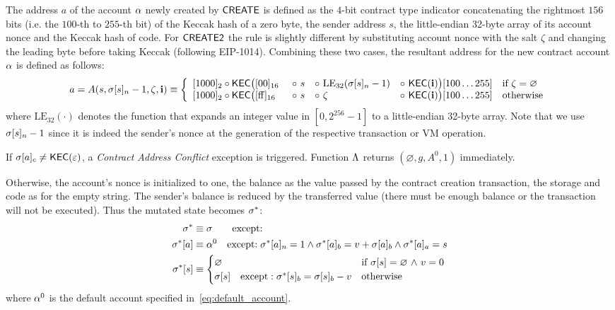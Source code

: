 The address $a$ of the account $\mathbf{\alpha}$ newly created by {\hyperlink{create}{$\mathsf{CREATE}$}} is defined as the $4$-bit contract type indicator concatenating the rightmost $156$ bits (i.e. the $100$-th to $255$-th bit) of the Keccak hash of a zero byte, the sender address $s$, the little-endian 32-byte array of its account nonce and the Keccak hash of \cvm code. 
% 
For {\hyperlink{create2}{$\mathsf{CREATE2}$}} the rule is slightly different by substituting account nonce with the salt $\zeta$ and changing the leading byte before taking Keccak (following EIP-1014).
Combining these two cases, 
the resultant address for the new contract account $\mathbf{\alpha}$ is defined as follows:
\begin{align}\label{eq:new-address}
	a= A(s, \st[s]_{n} - 1, \zeta, \vec{i}) \eqdef 
	\left\{\begin{array}{l l l l l}
	 	\typecontract \circ \kec\big([\mathrm{00}]_{16} &~\circ~ s &\circ~ \mathrm{LE}_{32}(\st[s]_n-1) &\circ~ \kec(\vec{i}) \big)[100 \dots 255]
	 	& \text{if}\ \zeta = \varnothing \\
	 	\typecontract \circ \kec\big([\mathrm{ff}]_{16} &~\circ~ s &\circ~  \zeta   &\circ~ \kec(\vec{i}) \big)[100 \dots 255] 
		& \text{otherwise}
	\end{array} \right.
\end{align}
where $\mathrm{LE}_{32}(\cdot)$ denotes the function that expands an integer value in $[0,2^{256}-1]$ to a little-endian 32-byte array. 
%
Note that we use $\mathbf{\sigma}[s]_n-1$ since it is indeed the sender's nonce at the generation of the respective transaction or VM operation. 

If $\mathbf{\sigma}[a]_c\neq \mathsf{KEC}(\mathbb{\varepsilon})$, a \emph{Contract Address Conflict} exception is triggered. Function $\mathrm{\Lambda}$ returns $(\varnothing,g,A^0,1)$ immediately. 

Otherwise, the account's nonce is initialized to one, the balance as the value passed by the contract creation transaction,
the storage and code as for the empty string.
The sender's balance is reduced by the transferred value (there must be enough balance or the transaction will not be executed).
Thus the mutated state becomes $\mathbf{\sigma}^*$:
\begin{align}
	\mathbf{\sigma}^* & \equiv \mathbf{\sigma} \qquad{ \text{except:}}\\
	\mathbf{\sigma}^*[a] &\equiv \mathbf{\alpha}^0 \quad\text{except:}\; \mathbf{\sigma}^*[a]_n=1 \wedge \mathbf{\sigma}^*[a]_b=v+\mathbf{\sigma}[a]_b \wedge \mathbf{\sigma}^*[a]_a=s\\
	\mathbf{\sigma}^*[s] &\equiv \begin{cases}
		\varnothing & \mbox{if $\mathbf{\sigma}[s]=\varnothing$ $\land$ $v=0$}\\
		\mathbf{\sigma}[s]\quad\mbox{except}:	\mathbf{\sigma}^*[s]_b=\mathbf{\sigma}[s]_b-v	& \mbox{otherwise}
	\end{cases}
\end{align}
where $\mathbf{\alpha}^0$ is the default account specified in~\cref{eq:default_account}. 

